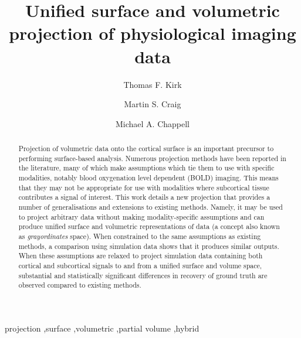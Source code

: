 \documentclass[review]{elsarticle}
\begin{document}
\begin{frontmatter}

\title{Unified surface and volumetric projection of physiological imaging data}

\address[IBME]{Institute of Biomedical Engineering, Department of Engineering Science, University of Oxford}
\address[WIN]{Wellcome Centre for Integrative Neuroimaging, Nuffield Department of Clinical Neurosciences, University of Oxford}
\address[MHCN]{Mental Health and Clinical Neurosciences, School of Medicine, University of Nottingham}
\address[SPMIC]{Sir Peter Mansfield Imaging Centre, School of Medicine, University of Nottingham}

\author[IBME,WIN]{Thomas F. Kirk}

\author[MHCN,SPMIC]{Martin S. Craig}
\author[MHCN,SPMIC,WIN]{Michael A. Chappell}



\begin{abstract}

Projection of volumetric data onto the cortical surface is an important precursor to performing surface-based analysis. Numerous projection methods have been reported in the literature, many of which make assumptions which tie them to use with specific modalities, notably blood oxygenation level dependent (BOLD) imaging. This means that they may not be appropriate for use with modalities where subcortical tissue contributes a signal of interest. This work details a new projection that provides a number of generalisations and extensions to existing methods. Namely, it may be used to project arbitrary data without making modality-specific assumptions and can produce unified surface and volumetric representations of data (a concept also known as \textit{grayordinates} space). When constrained to the same assumptions as existing methods, a comparison using simulation data shows that it produces similar outputs. When these assumptions are relaxed to project simulation data containing both cortical and subcortical signals to and from a unified surface and volume space, substantial and statistically significant differences in recovery of ground truth are observed compared to existing methods. 

\end{abstract}

\begin{keyword}
projection \sep surface \sep volumetric \sep partial volume \sep hybrid
\end{keyword}

\end{frontmatter}
\end{document}

